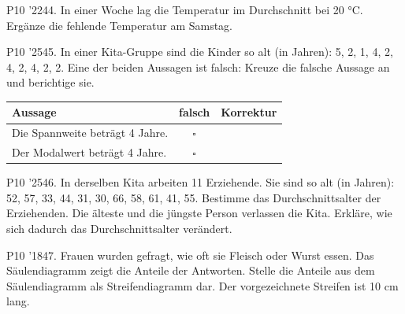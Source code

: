 \documentclass[11pt]{article}
\begin{document}
\pfgruppe{}
\begin{pfaufg}{P10 ’22}{44.}{}
In einer Woche lag die Temperatur im Durchschnitt bei 20 °C. Ergänze die fehlende Temperatur am Samstag.
\par\smallskip\noindent {}\par
{}
\end{pfaufg}
\pfgruppe{}
\begin{pfaufg}{P10 ’25}{45.}{}
In einer Kita-Gruppe sind die Kinder so alt (in Jahren): 5, 2, 1, 4, 2, 4, 2, 4, 2, 2. Eine der beiden Aussagen ist falsch: Kreuze die falsche Aussage an und berichtige sie.
\par\smallskip\noindent \begingroup\renewcommand{\arraystretch}{1.5}\begin{tabular}{|p{7.8cm}|c|p{3.4cm}|}\hline Aussage & falsch & Korrektur \\ \hline Die Spannweite beträgt 4 Jahre. & $\square$ &  \\ \hline Der Modalwert beträgt 4 Jahre. & $\square$ &  \\ \hline\end{tabular}\endgroup\par
{}
\end{pfaufg}
\pfgruppe{}
\begin{pfaufg}{P10 ’25}{\llap{\textasteriskcentered\,}46.}{}
In derselben Kita arbeiten 11 Erziehende. Sie sind so alt (in Jahren): 52, 57, 33, 44, 31, 30, 66, 58, 61, 41, 55. Bestimme das Durchschnittsalter der Erziehenden. Die älteste und die jüngste Person verlassen die Kita. Erkläre, wie sich dadurch das Durchschnittsalter verändert.
\end{pfaufg}
\pfgruppe{}
\begin{pfaufg}{P10 ’18}{47.}{}
Frauen wurden gefragt, wie oft sie Fleisch oder Wurst essen. Das Säulendiagramm zeigt die Anteile der Antworten. Stelle die Anteile aus dem Säulendiagramm als Streifendiagramm dar. Der vorgezeichnete Streifen ist 10 cm lang.
\par\smallskip\noindent {}\par
{}
\end{pfaufg}
\end{document}
